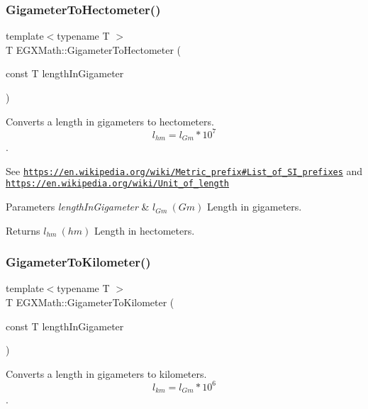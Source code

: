 \subsubsection{\texorpdfstring{Gigameter\+To\+Hectometer()}{GigameterToHectometer()}}
{\footnotesize\ttfamily template$<$typename T $>$ \\
T E\+G\+X\+Math\+::\+Gigameter\+To\+Hectometer (\begin{DoxyParamCaption}\item[{const T}]{length\+In\+Gigameter }\end{DoxyParamCaption})}



Converts a length in gigameters to hectometers. \[ l_{hm}=l_{Gm} * 10^{7} \]. 

See \href{https://en.wikipedia.org/wiki/Metric_prefix#List_of_SI_prefixes}{\tt https\+://en.\+wikipedia.\+org/wiki/\+Metric\+\_\+prefix\#\+List\+\_\+of\+\_\+\+S\+I\+\_\+prefixes} and \href{https://en.wikipedia.org/wiki/Unit_of_length}{\tt https\+://en.\+wikipedia.\+org/wiki/\+Unit\+\_\+of\+\_\+length} 
\begin{DoxyParams}{Parameters}
{\em length\+In\+Gigameter} & $ l_{Gm}\ (Gm)$ Length in gigameters. \\
\hline
\end{DoxyParams}
\begin{DoxyReturn}{Returns}
$ l_{hm}\ (hm)$ Length in hectometers. 
\end{DoxyReturn}
\mbox{\label{group___e_g_x_math-_conversions-_length_conversions-_gigameter-_s_i_ga6f5a65da868d2c40485588dff765836e}} 
\subsubsection{\texorpdfstring{Gigameter\+To\+Kilometer()}{GigameterToKilometer()}}
{\footnotesize\ttfamily template$<$typename T $>$ \\
T E\+G\+X\+Math\+::\+Gigameter\+To\+Kilometer (\begin{DoxyParamCaption}\item[{const T}]{length\+In\+Gigameter }\end{DoxyParamCaption})}



Converts a length in gigameters to kilometers. \[ l_{km}=l_{Gm} * 10^{6} \]. 

